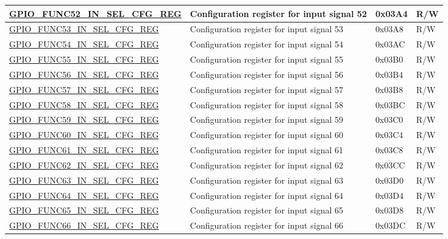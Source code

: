 \begin{longtable}{ | p{5.5cm} | p{7cm} | p{1.3cm} | p{1.9cm} | }
\hyperref[regdesc:GPIOFUNCRINSELCFGREG]{GPIO\_FUNC52\_IN\_SEL\_CFG\_REG} & Configuration register for input signal 52 & 0x03A4 & R/W \\ \hline
\hyperref[regdesc:GPIOFUNCRINSELCFGREG]{GPIO\_FUNC53\_IN\_SEL\_CFG\_REG} & Configuration register for input signal 53 & 0x03A8 & R/W \\ \hline
\hyperref[regdesc:GPIOFUNCRINSELCFGREG]{GPIO\_FUNC54\_IN\_SEL\_CFG\_REG} & Configuration register for input signal 54 & 0x03AC & R/W \\ \hline
\hyperref[regdesc:GPIOFUNCRINSELCFGREG]{GPIO\_FUNC55\_IN\_SEL\_CFG\_REG} & Configuration register for input signal 55 & 0x03B0 & R/W \\ \hline
\hyperref[regdesc:GPIOFUNCRINSELCFGREG]{GPIO\_FUNC56\_IN\_SEL\_CFG\_REG} & Configuration register for input signal 56 & 0x03B4 & R/W \\ \hline
\hyperref[regdesc:GPIOFUNCRINSELCFGREG]{GPIO\_FUNC57\_IN\_SEL\_CFG\_REG} & Configuration register for input signal 57 & 0x03B8 & R/W \\ \hline
\hyperref[regdesc:GPIOFUNCRINSELCFGREG]{GPIO\_FUNC58\_IN\_SEL\_CFG\_REG} & Configuration register for input signal 58 & 0x03BC & R/W \\ \hline
\hyperref[regdesc:GPIOFUNCRINSELCFGREG]{GPIO\_FUNC59\_IN\_SEL\_CFG\_REG} & Configuration register for input signal 59 & 0x03C0 & R/W \\ \hline
\hyperref[regdesc:GPIOFUNCRINSELCFGREG]{GPIO\_FUNC60\_IN\_SEL\_CFG\_REG} & Configuration register for input signal 60 & 0x03C4 & R/W \\ \hline
\hyperref[regdesc:GPIOFUNCRINSELCFGREG]{GPIO\_FUNC61\_IN\_SEL\_CFG\_REG} & Configuration register for input signal 61 & 0x03C8 & R/W \\ \hline
\hyperref[regdesc:GPIOFUNCRINSELCFGREG]{GPIO\_FUNC62\_IN\_SEL\_CFG\_REG} & Configuration register for input signal 62 & 0x03CC & R/W \\ \hline
\hyperref[regdesc:GPIOFUNCRINSELCFGREG]{GPIO\_FUNC63\_IN\_SEL\_CFG\_REG} & Configuration register for input signal 63 & 0x03D0 & R/W \\ \hline
\hyperref[regdesc:GPIOFUNCRINSELCFGREG]{GPIO\_FUNC64\_IN\_SEL\_CFG\_REG} & Configuration register for input signal 64 & 0x03D4 & R/W \\ \hline
\hyperref[regdesc:GPIOFUNCRINSELCFGREG]{GPIO\_FUNC65\_IN\_SEL\_CFG\_REG} & Configuration register for input signal 65 & 0x03D8 & R/W \\ \hline
\hyperref[regdesc:GPIOFUNCRINSELCFGREG]{GPIO\_FUNC66\_IN\_SEL\_CFG\_REG} & Configuration register for input signal 66 & 0x03DC & R/W \\ \hline

\end{longtable}
